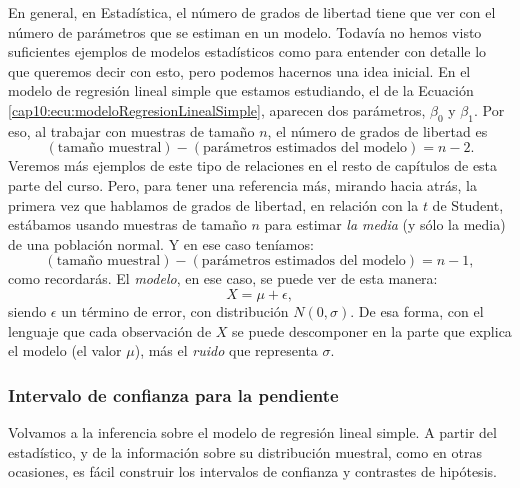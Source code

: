 En general, en Estadística, el número de grados de libertad tiene que ver con el número de parámetros que se estiman en un modelo. Todavía no hemos visto suficientes ejemplos de modelos estadísticos como para entender con detalle lo que queremos decir con esto, pero podemos hacernos una idea inicial. En el modelo de regresión lineal simple que estamos estudiando, el de la Ecuación \ref{cap10:ecu:modeloRegresionLinealSimple}, aparecen dos parámetros, $\beta_0$ y $\beta_1$. Por eso, al trabajar con muestras de tamaño $n$, el número de grados de libertad es
\begin{equation}\label{cap10:ec:numerogradoslibertad}
(\mbox{tamaño muestral})-(\mbox{parámetros estimados del modelo})= n - 2.
\end{equation}
Veremos más ejemplos de este tipo de relaciones en el resto de capítulos de esta parte del curso. Pero, para tener una referencia más, mirando hacia atrás, la primera vez que hablamos de grados de libertad, en relación con la $t$ de Student, estábamos usando muestras de tamaño $n$ para estimar {\em la media} (y sólo la media) de una población normal. Y en ese caso teníamos:
\begin{equation*}
(\mbox{tamaño muestral})-(\mbox{parámetros estimados del modelo})= n - 1,
\end{equation*}
como recordarás. El {\em modelo}, en ese caso, se puede ver de esta manera:
\[X=\mu+\epsilon,\]
siendo $\epsilon$ un término de error, con distribución $N(0,\sigma)$. De esa forma, con el lenguaje que cada observación de $X$ se puede descomponer en la parte que explica el modelo (el valor $\mu$), más el {\em ruido} que representa $\sigma$.

\subsubsection{Intervalo de confianza para la pendiente}
\label{cap10:subsubsec:IntervaloConfianzaPendiente}

Volvamos a la inferencia sobre el modelo de regresión lineal simple. A partir del estadístico, y de la información sobre su distribución muestral, como en otras ocasiones, es fácil construir los intervalos de confianza y contrastes de hipótesis.

